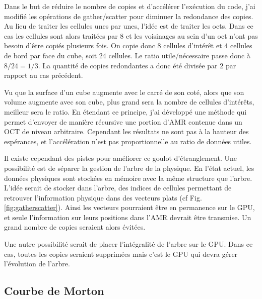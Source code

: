 Dans le but de réduire le nombre de copies et d'accélérer l'exécution du code, j'ai modifié les opérations de gather/scatter pour diminuer la redondance des copies.
Au lieu de traiter les cellules unes par unes, l'idée est de traiter les octs.
Dans ce cas les cellules sont alors traitées par 8 et les voisinages au sein d'un oct n'ont pas besoin d'être copiés plusieurs fois.
On copie donc 8 cellules d'intérêt et 4 cellules de bord par face du cube, soit 24 cellules.
Le ratio utile/nécessaire passe donc à $8/24 = 1/3$.
La quantité de copies redondantes a donc été divisée par 2 par rapport au cas précédent.

Vu que la surface d'un cube augmente avec le carré de son coté, alors que son volume augmente avec son cube, plus grand sera la nombre de cellules d'intérêts, meilleur sera le ratio.
En étendant ce principe, j'ai développé une méthode qui permet d'envoyer de manière récursive une portion d'\ac{AMR} contenue dans un OCT de niveau arbitraire.
Cependant les résultats ne sont pas à la hauteur des espérances, et l'accélération n'est pas proportionnelle au ratio de données utiles.

Il existe cependant des pistes pour améliorer ce goulot d'étranglement.
Une possibilité est de séparer la gestion de l'arbre de la physique.
En l'état actuel, les données physiques sont stockées en mémoire avec la même structure que l'arbre.
L'idée serait de stocker dans l'arbre, des indices de cellules permettant de retrouver l'information physique dans des vecteurs plats (cf Fig. \ref{fig:gatherscatter}).
Ainsi les vecteurs pourraient être en permanence sur le \ac{GPU}, et seule l'information sur leurs positions dans l'\ac{AMR} devrait être transmise.
Un grand nombre de copies seraient alors évitées. 

Une autre possibilité serait de placer l'intégralité de l'arbre sur le \ac{GPU}.
Dans ce cas, toutes les copies seraient supprimées mais c'est le \ac{GPU} qui devra gérer l'évolution de l'arbre. 

\subsection{Courbe de Morton}

